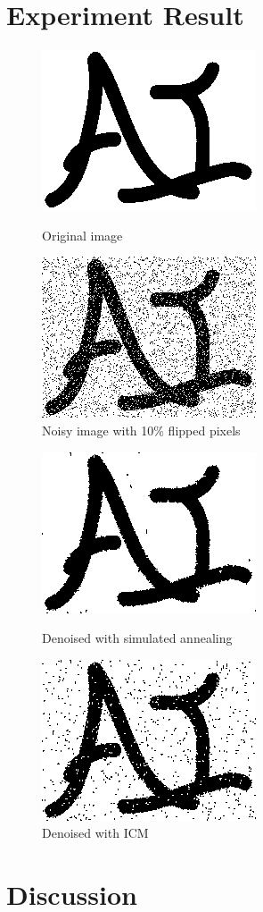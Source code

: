 \documentclass{article}
\begin{document}
\section{Experiment Result}

\begin{figure}[H]
	\begin{minipage}[b]{0.48\linewidth}
		\centering
		\includegraphics[width=180pt]{../img/in.png}
		\caption{Original image}
	\end{minipage}
	\begin{minipage}[b]{0.48\linewidth}
		\centering
		\includegraphics[width=180pt]{../img/flipped.png}
		\caption{Noisy image with 10\% flipped pixels}
	\end{minipage}
\end{figure}
\begin{figure}[H]
	\centering
	\begin{minipage}[b]{0.45\linewidth}
		\centering
		\includegraphics[width=180pt]{../img/best.png}
		\caption{Denoised with simulated annealing}
	\end{minipage}
	\begin{minipage}[b]{0.45\linewidth}
		\centering
		\includegraphics[width=180pt]{../img/icm.png}
		\caption{Denoised with ICM}
	\end{minipage}
\end{figure}

\section{Discussion}
\end{document}
